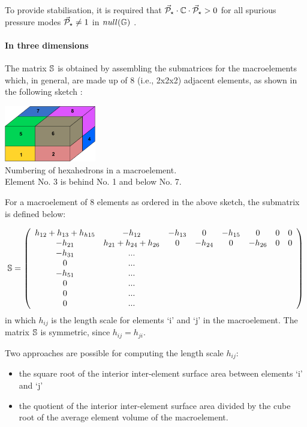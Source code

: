 To provide stabilisation, it is required that
$\vec{\cal P}_\star \cdot {\mathbb{C}} \cdot \vec{\cal P}_\star > 0$ for all
spurious pressure modes $\vec{\cal P}_\star \neq 1$ in $null({\mathbb{G}})$ \cite[p239]{elsw}.


\paragraph{In three dimensions}


The matrix ${\mathbb{S}}$ is obtained by assembling the submatrices 
for the macroelements which, in general, are made up of 8 (i.e., 2x2x2) 
adjacent elements, as shown in the following sketch \cite{chsu97}:

\begin{center}
\includegraphics[width=4cm]{images/q1p0stab/macro3D}\\
{\captionfont Numbering of hexahedrons in a macroelement.\\ 
Element No. 3 is behind No. 1 and below No. 7.} 
\end{center}

For a macroelement of 8 elements as ordered in the above sketch, the submatrix is defined below:

\[
{\mathbb{S}}=
\left(
\begin{array}{cccccccc}
h_{12}+h_{13}+h_{h15} & -h_{12} & -h_{13} &  0  &  -h_{15} & 0  & 0 & 0 \\
-h_{21} & h_{21}+h_{24} + h_{26} & 0 & -h_{24} & 0 & -h_{26} & 0 & 0 \\
-h_{31} & ... \\
0 & ... \\
-h_{51} & ...\\
0 & ...\\
0 & ...\\
0 & ...
\end{array}
\right)
\]
in which $h_{ij}$ is the length scale for elements `i' and `j' in the macroelement. 
The matrix ${\mathbb{S}}$ is symmetric, since $h_{ij}=h_{ji}$. 

Two approaches are possible  for computing the length scale $h_{ij}$:
\begin{itemize}
\item the square root of the interior inter-element surface area between elements `i' and `j'
\item the quotient of the interior inter-element surface area divided by the cube 
root of the average element volume of the macroelement.
\end{itemize}


